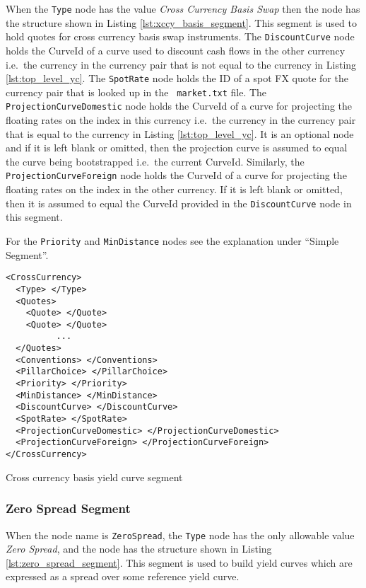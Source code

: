 When the \lstinline!Type! node has the value \emph{Cross Currency Basis Swap} then the node has the structure shown in
Listing \ref{lst:xccy_basis_segment}. This segment is used to hold quotes for cross currency basis swap instruments. The
\lstinline!DiscountCurve! node holds the CurveId of a curve used to discount cash flows in the other currency i.e.\ the
currency in the currency pair that is not equal to the currency in Listing \ref{lst:top_level_yc}. The
\lstinline!SpotRate! node holds the ID of a spot FX quote for the currency pair that is looked up in the {\tt
  market.txt} file. The \lstinline!ProjectionCurveDomestic! node holds the CurveId of a curve for projecting the
floating rates on the index in this currency i.e.\ the currency in the currency pair that is equal to the currency in
Listing \ref{lst:top_level_yc}. It is an optional node and if it is left blank or omitted, then the projection curve is
assumed to equal the curve being bootstrapped i.e.\ the current CurveId. Similarly, the
\lstinline!ProjectionCurveForeign! node holds the CurveId of a curve for projecting the floating rates on the index in
the other currency. If it is left blank or omitted, then it is assumed to equal the CurveId provided in the
\lstinline!DiscountCurve! node in this segment.

For the \lstinline!Priority! and \lstinline!MinDistance! nodes see the explanation under ``Simple Segment''.

\begin{listing}[H]
\begin{verbatim}
<CrossCurrency>
  <Type> </Type>
  <Quotes>
    <Quote> </Quote>
    <Quote> </Quote>
          ...
  </Quotes>
  <Conventions> </Conventions>
  <PillarChoice> </PillarChoice>
  <Priority> </Priority>
  <MinDistance> </MinDistance>
  <DiscountCurve> </DiscountCurve>
  <SpotRate> </SpotRate>
  <ProjectionCurveDomestic> </ProjectionCurveDomestic>
  <ProjectionCurveForeign> </ProjectionCurveForeign>
</CrossCurrency>
\end{verbatim}
\caption{Cross currency basis yield curve segment}
\label{lst:xccy_basis_segment}
\end{listing}

\subsubsection*{Zero Spread Segment}

When the node name is \lstinline!ZeroSpread!, the \lstinline!Type!
node has the only allowable value \emph{Zero Spread},  and the node has the structure shown in 
Listing \ref{lst:zero_spread_segment}. This segment is used to build yield
curves which are expressed as a spread over some reference yield curve.

